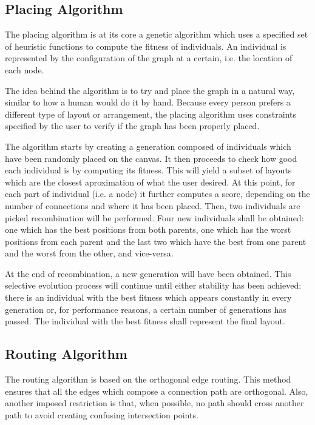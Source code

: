 \label{chap:impl}

\subsection{Placing Algorithm}
 
The placing algorithm is at its core a genetic algorithm \cite{back1997handbook} which uses
a specified set of heuristic functions to compute the fitness of individuals.
An individual is represented by the configuration of the graph at a certain, i.e.
the location of each node.

The idea behind the algorithm is to try and place the graph in a natural way, similar
to how a human would do it by hand. Because every person prefers a different type of 
layout or arrangement, the placing algorithm uses constraints specified by the user
to verify if the graph has been properly placed.

The algorithm starts by creating a generation composed of individuals which have 
been randomly placed on the canvas. It then proceeds to check how good each 
individual is by computing its fitness. This will yield a subset of layouts which
are the closest aproximation of what the user desired. At this point, for each 
part of individual (i.e. a node) it further computes a score, depending on the
number of connections and where it has been placed. Then, two individuals are 
picked recombination will be performed. Four new individuals shall be obtained:
one which has the best positions from both parents, one which has the worst positions
from each parent and the last two which have the best from one parent and the 
worst from the other, and vice-versa.

At the end of recombination, a new generation will have been obtained. This selective 
evolution process \cite{back1996evolutionary} will continue until either stability has been achieved: there is an
individual with the best fitness which appears constantly in every generation or, for 
performance reasons, a certain number of generations has passed. The individual with 
the best fitness shall represent the final layout.

\subsection{Routing Algorithm}

The routing algorithm is based on the orthogonal edge routing. This method ensures 
that all the edges which compose a connection path are orthogonal. Also, another 
imposed restriction is that, when possible, no path should cross another path to 
avoid creating confusing intersection points.

